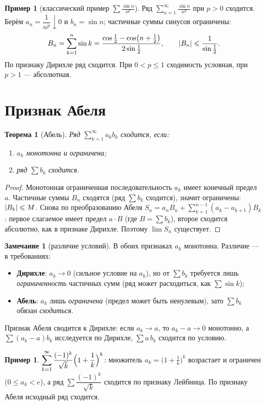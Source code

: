 \documentclass[11pt,a4paper]{article}
\theoremstyle{definition}
\newtheorem{example}[definition]{Пример}
\newtheorem{remark}[definition]{Замечание}
\theoremstyle{plain}
\newtheorem{theorem}[definition]{Теорема}
\renewcommand{\le}{\leqslant}
\DeclarePairedDelimiter{\abs}{\lvert}{\rvert}
\begin{document}
\begin{example}[классический пример $\sum\frac{\sin n}{n^p}$]
Ряд $\displaystyle\sum_{n=1}^\infty\frac{\sin n}{n^p}$ при $p>0$ сходится. Берём
$a_n=\dfrac1{n^p}\downarrow0$ и $b_n=\sin n$; частичные суммы синусов ограничены:
\[
  B_n=\sum_{k=1}^n\sin k=\frac{\cos\frac12-\cos\bigl(n+\frac12\bigr)}{2\sin\frac12},\qquad
  \abs{B_n}\le\frac{1}{\sin\frac12}.
\]
По признаку Дирихле ряд сходится. При $0<p\le1$ сходимость условная, при $p>1$ — абсолютная.
\end{example}

\section{Признак Абеля}

\begin{theorem}[Абель]
Ряд $\displaystyle\sum_{k=1}^\infty a_k b_k$ сходится, если:
\begin{enumerate}[label=\arabic*),leftmargin=*]
  \item $a_k$ монотонна и ограничена;
  \item ряд $\sum b_k$ сходится.
\end{enumerate}
\end{theorem}

\begin{proof}
Монотонная ограниченная последовательность $a_k$ имеет конечный предел $a$. Частичные суммы $B_n$
сходятся (ряд $\sum b_k$ сходится), значит ограничены: $\abs{B_k}\le M$. Снова по преобразованию
Абеля $S_n=a_n B_n+\sum_{k=1}^{n-1}(a_k-a_{k+1})B_k$: первое слагаемое имеет предел $a\cdot B$
(где $B=\sum b_k$), второе сходится абсолютно, как в признаке Дирихле. Поэтому $\lim S_n$
существует.
\end{proof}

\begin{remark}[различие условий]
В обоих признаках $a_k$ монотонна. Различие — в требованиях:
\begin{itemize}[leftmargin=*]
  \item \textbf{Дирихле}: $a_k\to0$ (сильное условие на $a_k$), но от $\sum b_k$ требуется лишь
        \emph{ограниченность} частичных сумм (ряд может расходиться, как $\sum\sin k$);
  \item \textbf{Абель}: $a_k$ лишь \emph{ограничена} (предел может быть ненулевым), зато $\sum b_k$
        обязан \emph{сходиться}.
\end{itemize}
Признак Абеля сводится к Дирихле: если $a_k\to a$, то $a_k-a\to0$ монотонно, а
$\sum(a_k-a)b_k$ исследуется по Дирихле, $\sum a\,b_k$ сходится по условию.
\end{remark}

\begin{example}
$\displaystyle\sum_{k=1}^\infty\frac{(-1)^k}{\sqrt k}\Bigl(1+\frac1k\Bigr)^k$: множитель
$a_k=\bigl(1+\tfrac1k\bigr)^k$ возрастает и ограничен ($0\le a_k<e$), а ряд
$\sum\dfrac{(-1)^k}{\sqrt k}$ сходится по признаку Лейбница. По признаку Абеля исходный ряд
сходится.
\end{example}
\end{document}
